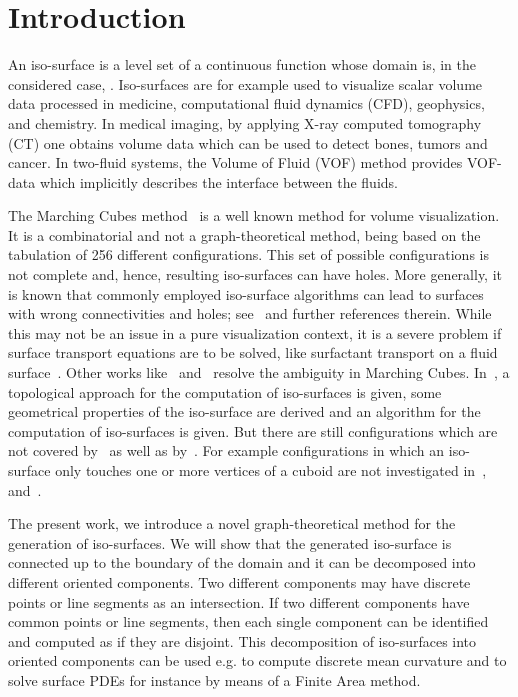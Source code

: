 \documentclass[a4paper,11pt]{article}
\begin{document}
\section{Introduction}
An iso-surface is a level set of a continuous function whose domain is, in the considered case, .
Iso-surfaces are for example used to visualize scalar volume data processed in medicine, computational
fluid dynamics (CFD), geophysics, and chemistry. In medical imaging, by applying X-ray computed tomography
(CT) one obtains volume data which can be used to detect bones, tumors and cancer. In two-fluid systems,
the Volume of Fluid (VOF) method provides VOF-data which implicitly describes the interface between the fluids.

The Marching Cubes method~\cite{Lorensen87marchingcubes:} is a well known method for volume
visualization. It is a combinatorial and not a graph-theoretical method, being based on the tabulation
of 256 different configurations. This set of possible configurations is not complete and, hence,
resulting iso-surfaces can have holes. More generally, it is known that commonly employed iso-surface
algorithms can lead to surfaces with wrong connectivities and holes; see~\cite{Etiene:2012:TVI:2197070.2197097}
and further references therein. While this may not be an issue in a pure visualization context, it is a severe
problem if surface transport equations are to be solved, like surfactant transport on a fluid
surface~\cite{Alke_and_Bothe}. Other works like~\cite{Nielson:1991:ADR:949607.949621}
and~\cite{Chernyaev95marchingcubes} resolve the
ambiguity in Marching Cubes. In~\cite{conf/dgci/Lachaud96}, a topological approach for the
computation of iso-surfaces is given, some geometrical properties of the iso-surface are derived and an
algorithm for the computation of iso-surfaces is given. But there are still configurations which are not
covered by~\cite{Nielson:1991:ADR:949607.949621} as well as by~\cite{conf/dgci/Lachaud96}. For
example configurations in which an iso-surface only touches one or more vertices of a cuboid are not investigated
in~\cite{Chernyaev95marchingcubes},~\cite{conf/dgci/Lachaud96} and~\cite{Nielson:1991:ADR:949607.949621}.

The present work, we introduce a novel graph-theoretical method for the generation of iso-surfaces. We will show
that the generated iso-surface is connected up to the boundary of the domain and it can be decomposed into
different oriented components. Two different components may have discrete points or line segments as an
intersection. If two different components have common points or line segments, then each single component
can be identified and computed as if they are disjoint. This decomposition
of iso-surfaces into oriented components can be used e.g. to compute discrete mean curvature and to solve
surface PDEs for instance by means of a Finite Area method.
\end{document}
